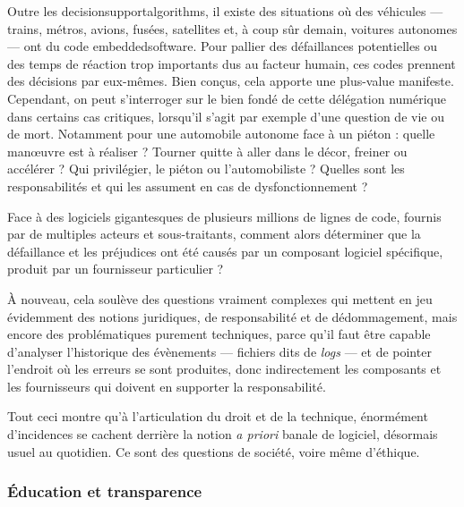 Outre les \glspl{decisionsupportalgorithm}, il existe des situations où des véhicules --- trains, métros, avions, fusées, satellites et, à coup sûr demain, voitures autonomes --- ont du code \gls{embeddedsoftware}. Pour pallier des défaillances potentielles ou des temps de réaction trop importants dus au facteur humain, ces codes prennent des décisions par eux-mêmes. Bien conçus, cela apporte une plus-value manifeste. Cependant, on peut s'interroger sur le bien fondé de cette délégation numérique dans certains cas critiques, lorsqu'il s'agit par exemple d'une question de vie ou de mort. Notamment pour une automobile autonome face à un piéton : quelle manœuvre est à réaliser ? Tourner quitte à aller dans le décor, freiner ou accélérer ? Qui privilégier, le piéton ou l'automobiliste ? Quelles sont les responsabilités et qui les assument en cas de dysfonctionnement ?

Face à des logiciels gigantesques de plusieurs millions de lignes de code, fournis par de multiples acteurs et sous-traitants, comment alors déterminer que la défaillance et les préjudices ont été causés par un composant logiciel spécifique, produit par un fournisseur particulier ?

À nouveau, cela soulève des questions vraiment complexes qui met\-tent en jeu évidemment des notions juridiques, de responsabilité et de dédommagement, mais encore des problématiques purement techni\-ques, parce qu'il faut être capable d'analyser l'historique des évènements --- fichiers dits de \textit{logs} --- et de pointer l'endroit où les erreurs se sont produites, donc indirectement les composants et les fournisseurs qui doivent en supporter la responsabilité. 

Tout ceci montre qu'à l'articulation du droit et de la technique, énormément d'incidences se cachent derrière la notion \textit{a priori} banale de logiciel, désormais usuel au quotidien. Ce sont des questions de société, voire même d'éthique.


\subsubsection[Éducation et transparence]{Éducation et transparence}
\label{subsub:I.4.1.4}


